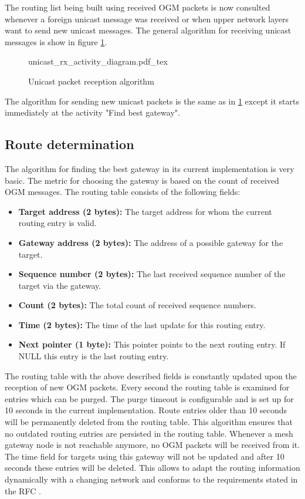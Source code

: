 The routing list being built using received OGM packets is now consulted whenever a foreign unicast message was received or when upper network layers want to send new unicast messages. The general algorithm for receiving unicast messages is show in figure \ref{fig:unicast_alg}.

\begin{figure}[H]
    \centering
    \sffamily
    {unicast_rx_activity_diagram.pdf_tex}
    \rmfamily
    \caption{Unicast packet reception algorithm}
    \label{fig:unicast_alg}
\end{figure}

The algorithm for sending new unicast packets is the same as in \ref{fig:unicast_alg} except it starts immediately at the activity "Find best gateway".

\subsection{Route determination}%
\label{sec:route}
The algorithm for finding the best gateway in its current implementation is very basic. The metric for choosing the gateway is based on the count of received OGM messages. The routing table consists of the following fields:

\begin{itemize}
    \item \textbf{Target address (2 bytes):} The target address for whom the current routing entry is valid.
    \item \textbf{Gateway address (2 bytes):} The address of a possible gateway for the target.
    \item \textbf{Sequence number (2 bytes):} The last received sequence number of the target via the gateway.
    \item \textbf{Count (2 bytes):} The total count of received sequence numbers.
    \item \textbf{Time (2 bytes):} The time of the last update for this routing entry.
    \item \textbf{Next pointer (1 byte):} This pointer points to the next routing entry. If NULL this entry is the last routing entry.
\end{itemize}

The routing table with the above described fields is constantly updated upon the reception of new OGM packets. Every second the routing table is examined for entries which can be purged. The purge timeout is configurable and is set up for 10 seconds in the current implementation. Route entries older than 10 seconds will be permanently deleted from the routing table. This algorithm ensures that no outdated routing entries are persisted in the routing table. Whenever a mesh gateway node is not reachable anymore, no OGM packets will be received from it. The time field for targets using this gateway will not be updated and after 10 seconds these entries will be deleted. This allows to adapt the routing information dynamically with a changing network and conforms to the requirements stated in the RFC \cite{batmanrfc}.

